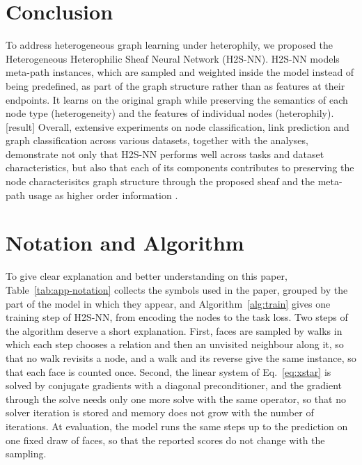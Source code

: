 \documentclass{article}
\newcommand{\method}{\textsc{H2S-NN}}
\newcommand{\res}{{\scriptsize[result]}}
\begin{document}
\section{Conclusion}
To address heterogeneous graph learning under heterophily, we proposed the Heterogeneous Heterophilic Sheaf Neural Network (\method{}). \method{} models meta-path instances, which are sampled and weighted inside the model instead of being predefined, as part of the graph structure rather than as features at their endpoints. It learns on the original graph while preserving the semantics of each node type (heterogeneity) and the features of individual nodes (heterophily). \res{} Overall, extensive experiments on node classification, link prediction and graph classification across various datasets, together with the analyses, demonstrate not only that \method{} performs well across tasks and dataset characteristics, but also that each of its components contributes to preserving the node characterisitcs graph structure through the proposed sheaf and the meta-path usage as higher order information .







\newpage



\appendix
\section{Notation and Algorithm}
\label{app:notation}
To give clear explanation and better understanding on this paper, Table~\ref{tab:app-notation} collects the symbols used in the paper, grouped by the part of the model in which they appear, and Algorithm~\ref{alg:train} gives one training step of \method{}, from encoding the nodes to the task loss. Two steps of the algorithm deserve a short explanation. First, faces are sampled by walks in which each step chooses a relation and then an unvisited neighbour along it, so that no walk revisits a node, and a walk and its reverse give the same instance, so that each face is counted once. Second, the linear system of Eq.~\ref{eq:xstar} is solved by conjugate gradients with a diagonal preconditioner, and the gradient through the solve needs only one more solve with the same operator, so that no solver iteration is stored and memory does not grow with the number of iterations. At evaluation, the model runs the same steps up to the prediction on one fixed draw of faces, so that the reported scores do not change with the sampling.
\end{document}
